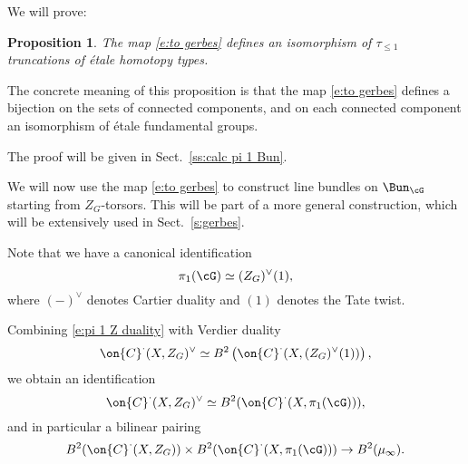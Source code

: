 \documentclass[9pt]{amsart}
\newtheorem{prop}[subsubsection]{Proposition}
\theoremstyle{remark}
\theoremstyle{definition}
\theoremstyle{remark}
\newcommand{\secref}[1]{Sect.~\ref{#1}}
\newcommand{\propref}[1]{Proposition~\ref{#1}}
\numberwithin{equation}{section}
\begin{document}
\sssec{}

We will prove:

\begin{prop} \label{p:pi 1 Bun}
The map \eqref{e:to gerbes} defines an isomorphism of $\tau_{\leq 1}$ truncations
of \'etale homotopy types.
\end{prop}

The concrete meaning of this proposition is that the map \eqref{e:to gerbes} defines a bijection on the sets
of connected components, and on each connected component an isomorphism of 
\'etale fundamental groups.

\medskip

The proof will be given in \secref{ss:calc pi 1 Bun}.

%
%
%
%
%


We will now use the map \eqref{e:to gerbes} to construct line bundles on $\Bun_\cG$ starting from $Z_G$-torsors. 
This will be part of a more general construction, which will be extensively used in \secref{s:gerbes}. 

\sssec{} 

Note that we have a canonical identification
\begin{equation} \label{e:pi 1 Z duality}
\pi_1(\cG)\simeq (Z_G)^\vee(1),
\end{equation} 
where $(-)^\vee$ denotes Cartier duality and $(1)$ denotes the Tate twist. 

\sssec{}

Combining \eqref{e:pi 1 Z duality} with Verdier duality 
$$\on{C}^\cdot(X,Z_G)^\vee\simeq B^2\left(\on{C}^\cdot(X,(Z_G)^\vee(1))\right),$$
we obtain an identification
\begin{equation} \label{e:Verdier duality}
\on{C}^\cdot(X,Z_G)^\vee \simeq B^2(\on{C}^\cdot(X,\pi_1(\cG))),
\end{equation} 
and in particular a bilinear pairing
\begin{equation} \label{e:Verdier pairing initial}
B^2(\on{C}^\cdot(X,Z_G))\times B^2(\on{C}^\cdot(X,\pi_1(\cG)))\to B^2(\mu_\infty).
\end{equation}
\end{document}
